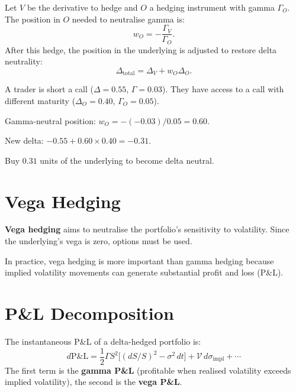\begin{proposition}
Let $V$ be the derivative to hedge and $O$ a hedging instrument with gamma
$\Gamma_O$. The position in $O$ needed to neutralise gamma is:
\[
    w_O = -\frac{\Gamma_V}{\Gamma_O}.
\]
After this hedge, the position in the underlying is adjusted to restore
delta neutrality:
\[
    \Delta_{\text{total}} = \Delta_V + w_O \Delta_O.
\]
\end{proposition}

\begin{example}
A trader is short a call ($\Delta = 0.55$, $\Gamma = 0.03$). They have
access to a call with different maturity ($\Delta_O = 0.40$,
$\Gamma_O = 0.05$).

Gamma-neutral position: $w_O = -(-0.03)/0.05 = 0.60$.

New delta: $-0.55 + 0.60 \times 0.40 = -0.31$.

Buy $0.31$ units of the underlying to become delta neutral.
\end{example}

\section{Vega Hedging}

\begin{definition}
\textbf{Vega hedging} aims to neutralise the portfolio's sensitivity to
volatility. Since the underlying's vega is zero, options must be used.
\end{definition}

\begin{remark}
In practice, vega hedging is more important than gamma hedging because
implied volatility movements can generate substantial profit and loss (P\&L).
\end{remark}

\section{P\&L Decomposition}

\begin{theorem}
The instantaneous P\&L of a delta-hedged portfolio is:
\[
    d\text{P\&L} = \frac{1}{2}\Gamma S^2\bigl[(dS/S)^2 - \sigma^2\,dt\bigr]
                 + \mathcal{V}\,d\sigma_{\text{impl}} + \cdots
\]
The first term is the \textbf{gamma P\&L} (profitable when realised
volatility exceeds implied volatility), the second is the \textbf{vega P\&L}.
\end{theorem}

